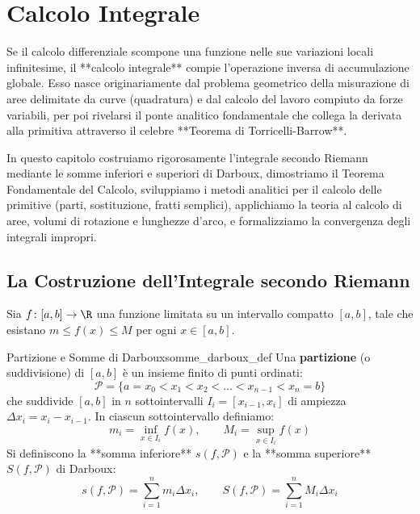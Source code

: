 \chapter{Calcolo Integrale}
\label{chap:calcolo_integrale}

Se il calcolo differenziale scompone una funzione nelle sue variazioni locali infinitesime, il **calcolo integrale** compie l'operazione inversa di accumulazione globale. Esso nasce originariamente dal problema geometrico della misurazione di aree delimitate da curve (quadratura) e dal calcolo del lavoro compiuto da forze variabili, per poi rivelarsi il ponte analitico fondamentale che collega la derivata alla primitiva attraverso il celebre **Teorema di Torricelli-Barrow**.

In questo capitolo costruiamo rigorosamente l'integrale secondo Riemann mediante le somme inferiori e superiori di Darboux, dimostriamo il Teorema Fondamentale del Calcolo, sviluppiamo i metodi analitici per il calcolo delle primitive (parti, sostituzione, fratti semplici), applichiamo la teoria al calcolo di aree, volumi di rotazione e lunghezze d'arco, e formalizziamo la convergenza degli integrali impropri.

\section{La Costruzione dell'Integrale secondo Riemann}
\label{sec:costruzione_riemann_teoria}

Sia $f \colon [a, b] \to \R$ una funzione limitata su un intervallo compatto $[a, b]$, tale che esistano $m \le f(x) \le M$ per ogni $x \in [a, b]$.

\begin{definizione}{Partizione e Somme di Darboux}{somme_darboux_def}
Una \textbf{partizione} (o suddivisione) di $[a, b]$ è un insieme finito di punti ordinati:
\[
    \mathcal{P} = \{a = x_0 < x_1 < x_2 < \dots < x_{n-1} < x_n = b\}
\]
che suddivide $[a, b]$ in $n$ sottointervalli $I_i = [x_{i-1}, x_i]$ di ampiezza $\Delta x_i = x_i - x_{i-1}$.
In ciascun sottointervallo definiamo:
\[
    m_i = \inf_{x \in I_i} f(x), \qquad M_i = \sup_{x \in I_i} f(x)
\]
Si definiscono la **somma inferiore** $s(f, \mathcal{P})$ e la **somma superiore** $S(f, \mathcal{P})$ di Darboux:
\[
    s(f, \mathcal{P}) = \sum_{i=1}^n m_i \Delta x_i, \qquad S(f, \mathcal{P}) = \sum_{i=1}^n M_i \Delta x_i
\]
\end{definizione}

